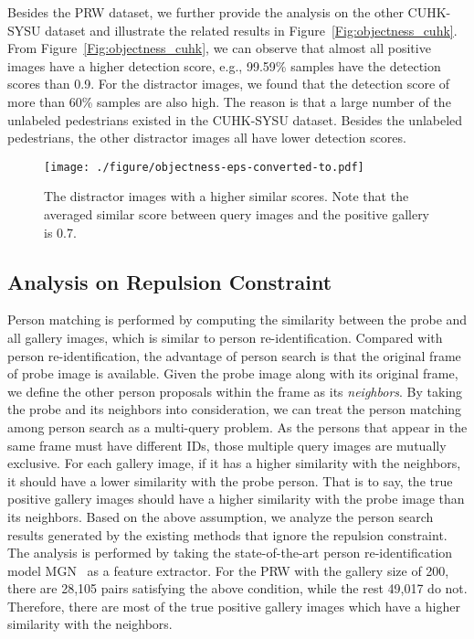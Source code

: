 \documentclass[journal]{IEEEtran}
\begin{document}
Besides the PRW dataset, we further provide the analysis on the other CUHK-SYSU dataset and illustrate the related results in Figure~\ref{Fig:objectness_cuhk}. From Figure~\ref{Fig:objectness_cuhk}, we can observe that almost all positive images have a higher detection score, e.g., 99.59\% samples have the detection scores than 0.9. For the distractor images, we found that the detection score of more than 60\% samples are also high. 
The reason is that a large number of the unlabeled pedestrians existed in the CUHK-SYSU dataset. Besides the unlabeled pedestrians, the other distractor images all have lower detection scores.


\begin{figure}
\begin{center}
\texttt{[image: ./figure/objectness-eps-converted-to.pdf]}
\end{center}
\caption{The distractor images with a higher similar scores. Note that the averaged similar score between query images and the positive gallery is 0.7.}
\label{Fig:objectness_show}
\end{figure}

\subsection{Analysis on Repulsion Constraint}
Person matching is performed by computing the similarity between the probe and all gallery images, which is similar to  person re-identification. Compared with person re-identification, the advantage of person search is that the original frame of probe image is available. Given the probe image along with its original frame, we define the other person proposals within the frame as its \emph{neighbors}.
By taking the probe and its neighbors into consideration, we can treat the person matching among person search as a multi-query problem.  As the persons that appear in the same frame must have different IDs, those multiple query images are mutually exclusive. 
For each gallery image, if it has a higher similarity with the neighbors, it should have a lower similarity with the probe person. 
That is to say, the true positive gallery images should have a higher similarity with the probe image than its neighbors. 
Based on the above assumption, we analyze the person search results generated by the existing methods that ignore the repulsion constraint. 
The analysis is performed by taking the state-of-the-art person re-identification model MGN~\cite{WangYCLZ18} as a feature extractor. 
For the PRW with the gallery size of 200, there are 28,105 pairs satisfying the above condition, while the rest 49,017 do not. Therefore, there are most of the true positive gallery images which have a higher similarity with the neighbors.
\end{document}
